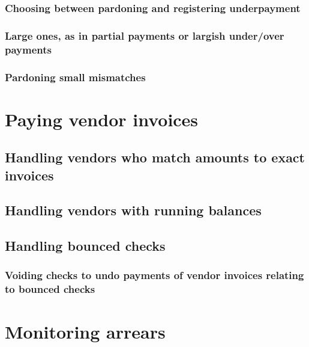 \subsection{Choosing between pardoning and registering underpayment}
\label{subsec-sales-payment-mismatch}

\subsection{Large ones, as in partial payments or largish under/over payments}
\label{subsec-sales-payment-partial}

\subsection{Pardoning small mismatches}
\label{subsec-sales-payment-pardoning}



\chapter{Paying vendor invoices}
\label{cha-starting-vendor-payments}

\section{Handling vendors who match amounts to exact invoices}
\label{sec-vendor-invoice-exact-match}

\section{Handling vendors with running balances}
\label{sec-vendor-invoice-running-balance}

\section{Handling bounced checks}
\label{sec-vendor-invoice-bounced-checks}

\subsection{Voiding checks to undo payments of vendor invoices
 relating to bounced checks}



\chapter{Monitoring arrears}
\label{cha-starting-monitoring-arrears}

